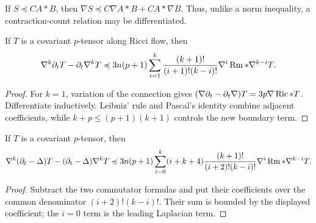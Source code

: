 \begin{remark}
\label{rem:chow-ii-differentiable-contraction-count}
If \(S\preccurlyeq C A*B\), then
\(\nabla S\preccurlyeq C\nabla A*B+C A*\nabla B\).  Thus, unlike a norm
inequality, a contraction-count relation may be differentiated.
\end{remark}

\begin{lemma}
\label{lem:chow-ii-nabla-time-commutator}
If \(T\) is a covariant \(p\)-tensor along Ricci flow, then
\[
 \nabla^k\partial_tT-\partial_t\nabla^kT
 \preccurlyeq3n(p+1)\sum_{i=1}^k
 \frac{(k+1)!}{(i+1)!(k-i)!}\nabla^i\operatorname{Rm}*\nabla^{k-i}T.
\]
\end{lemma}
\begin{proof}
For \(k=1\), variation of the connection gives
\((\nabla\partial_t-\partial_t\nabla)T=3p\nabla\operatorname{Ric}*T\).  Differentiate
inductively.  Leibniz' rule and Pascal's identity combine adjacent
coefficients, while \(k+p\leq(p+1)(k+1)\) controls the new boundary term.
\end{proof}

\begin{corollary}
\label{cor:chow-ii-nabla-heat-commutator}
If \(T\) is a covariant \(p\)-tensor, then
\[
 \nabla^k(\partial_t-\Delta)T-(\partial_t-\Delta)\nabla^kT
 \preccurlyeq3n(p+1)\sum_{i=0}^k(i+k+4)
 \frac{(k+1)!}{(i+2)!(k-i)!}\nabla^i\operatorname{Rm}*\nabla^{k-i}T.
\]
\end{corollary}
\begin{proof}
Subtract the two commutator formulas and put their coefficients over the
common denominator \((i+2)!(k-i)!\).  Their sum is bounded by the displayed
coefficient; the \(i=0\) term is the leading Laplacian term.
\end{proof}

